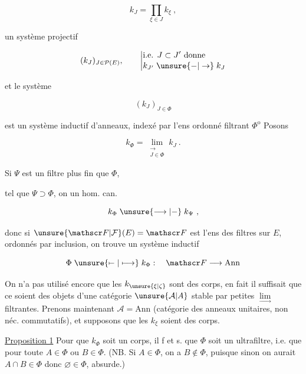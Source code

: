 \[
k_J=\prod_{\xi\in J}k_\xi\ ,
\]

     un système projectif 

\[
(k_J)_{J\in\mathcal P(E)},\qquad
\left|\begin{aligned}&\text{i.e. }J\subset J'\ \text{donne}\\[-2pt]
&k_{J'}\mathrel{\unsure{-|\to}} k_J
\end{aligned}\right.
\]

et  le système

\[
(k_J)_{J\in\Phi}
\]

est un système inductif d'anneaux, indexé par l'ens ordonné filtrant $\Phi^{\mathrm o}$\unsure{:|;} Posons

\[
k_\Phi=\underset{\substack{\longrightarrow\\J\in\Phi}}{\lim}k_J\ .
\]

Si $\Psi$ est un filtre plus fin que $\Phi$, 



tel que $\Psi\supset\Phi$, on  un hom. can.

\[
k_\Phi\mathrel{\unsure{\longrightarrow|-}} k_\Psi\ ,
\]

donc si $\unsure{\mathscr F|\mathcal F}(E)=\mathscr F$ est l'ens des  filtres sur $E$, ordonnés par inclusion, on trouve un système inductif

\[
\Phi\mathrel{\unsure{\mapstochar\relbar|\longmapsto}} k_\Phi:\quad\mathscr F\longrightarrow\mathrm{Ann}
\]

On n'a pas utilisé encore que les $k_{\unsure{\xi|\zeta}}$ sont des corps, en fait il suffisait que ce soient des objets d'une catégorie $\unsure{\mathcal A|A}$ stable par   petites $\underset{\longrightarrow}{\lim}$ filtrantes. Prenons maintenant $\mathcal A=\mathrm{Ann}$ (catégorie des anneaux unitaires, non néc. commutatifs), et supposons que les $k_\xi$ soient des corps.

\uline{Proposition 1}  Pour que $k_\Phi$ soit un corps, il f et s. que $\Phi$ soit un ultrafiltre, i.e. que pour toute   $A\in\Phi$ ou $B\in\Phi$. (NB. Si $A\in\Phi$, on a $B\notin\Phi$, puisque sinon on aurait $A\cap B\in\Phi$ donc $\varnothing\in\Phi$, absurde.)

